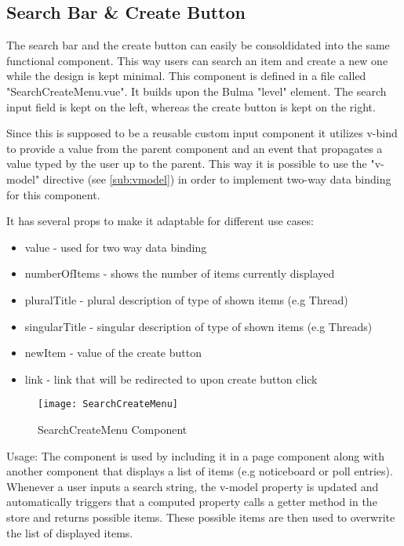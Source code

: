 \subsection{Search Bar \& Create Button}
The search bar and the create button can easily be consoldidated into the same functional component. This way users can search an item and create a new one while the design is kept minimal. This component is defined in a file called "SearchCreateMenu.vue". It builds upon the Bulma "level" element. The search input field is kept on the left, whereas the create button is kept on the right. 

Since this is supposed to be a reusable custom input component it utilizes v-bind to provide a value from the parent component and an event that propagates a value typed by the user up to the parent. This way it is possible to use the "v-model" directive (see \autoref{sub:vmodel}) in order to implement two-way data binding for this component. 

It has several props to make it adaptable for different use cases:

\begin{itemize}
  \item value - used for two way data binding
  \item numberOfItems - shows the number of items currently displayed
  \item pluralTitle - plural description of type of shown items (e.g Thread)
  \item singularTitle - singular description of type of shown items (e.g Threads)
  \item newItem - value of the create button
  \item link - link that will be redirected to upon create button click
\end{itemize}

\begin{figure}[H]
  \begin{center}
  \texttt{[image: SearchCreateMenu]}
  \end{center}
  \caption{SearchCreateMenu Component}
  \label{fig:searchcreate}
\end{figure}

Usage: The component is used by including it in a page component along with another component that displays a list of items (e.g noticeboard or poll entries). Whenever a user inputs a search string, the v-model property is updated and automatically triggers that a computed property calls a getter method in the store and returns possible items. These possible items are then used to overwrite the list of displayed items.

